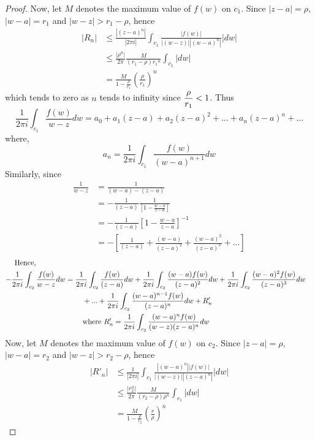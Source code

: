 \begin{proof}
Now, let $M$ denotes the maximum value of $f(w)$ on $c_1$. Since $|z-a|=\rho$, $|w-a|=r_1$ and $|w-z| >r_1 - \rho$, hence
\begin{align*}
|R_n| &\leq \frac{|(z-a)^n|}{|2\pi i|} \int_{c_1} \frac{|f(w)|}{|(w-z)||(w-a)^n|} |dw| \\
&\leq \frac{|\rho^n|}{2\pi} \frac{M}{(r_1 - \rho){r_1}^n}\int_{c_1}|dw|\\
&= \frac{M}{1-\frac{\rho}{r_1}} \left(\frac{\rho}{r_1}\right)^n
\end{align*}
 which tends to zero as $n$ tends to infinity since $\displaystyle \frac{\rho}{r_1} < 1$. Thus
\begin{equation}\label{Laurent2}
	\frac{1}{2\pi i}\int_{c_1} \frac{f(w)}{w-z} dw = a_0 + a_1(z-a) + a_2(z-a)^2 + ... + a_n(z-a)^n + ...
\end{equation}
where,
\[	a_n = \frac{1}{2\pi i} \int_{c_1}\frac{f(w)}{(w-a)^{n+1}} dw \]
Similarly, since
\begin{align*}
	\frac{1}{w-z} &= \frac{1}{(w-a)-(z-a)} \\
								&= -\frac{1}{(z-a)}\frac{1}{\left[{1-\frac{w-a}{z-a}}\right]} \\
								&= -\frac{1}{(z-a)}\left[{1-\frac{w-a}{z-a}}\right]^{-1} \\
								&= -\left[\frac{1}{(z-a)}+ \frac{(w-a)}{(z-a)^2}+ \frac{(w-a)^2}{(z-a)^3} + ... \right]
\end{align*}
\begin{align*}
\text{Hence,~~~~~~~~~~~~} \\
				-	\frac{1}{2\pi i}\int_{c_2} \frac{f(w)}{w-z}dw	&= \frac{1}{2\pi i}\int_{c_2} \frac{f(w)}{(z-a)}dw+ \frac{1}{2\pi i}\int_{c_2}\frac{(w-a)f(w)}{(z-a)^2}dw+ \frac{1 }{2\pi i}\int_{c_2}\frac{(w-a)^2f(w)}{(z-a)^3} dw\\
					& ~~~~~~~+ ... + \frac{1}{2\pi i}\int_{c_2} \frac{(w-a)^{n-1}f(w)}{(z-a)^n}dw + R'_n\\
					&~~~~~~~\text{where $\displaystyle R'_n= \frac{1}{2\pi i} \int_{c_2} \frac{(w-a)^nf(w)}{(w-z)(z-a)^n}dw$} 
\end{align*}
Now, let $M$ denotes the maximum value of $f(w)$ on $c_2$. Since $|z-a|=\rho$, $|w-a|=r_2$ and $|w-z| > r_2 - \rho$, hence
\begin{align*}
|R'_n| &\leq \frac{1}{|2\pi i|} \int_{c_1} \frac{|(w-a)^n||f(w)|}{|(w-z)||(z-a)^n|} |dw|  \\
&\leq \frac{|r_2^n|}{2\pi} \frac{M}{(r_2 - \rho ){\rho}^n}\int_{c_1}|dw|\\
&= \frac{M}{1-\frac{\rho}{r_2}} \left(\frac{r}{\rho}\right)^n

\end{align*}
\end{proof}
